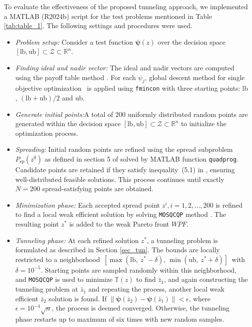 \documentclass[amsa]{ipart}
\theoremstyle{plain}
\numberwithin{equation}{section}
\newcommand{\xlm}{z^*}                    %
\newcommand{\obj}[1]{\psi_{#1}}               %
\newcommand{\fvec}{\boldsymbol{\psi}}         %
\newcommand{\Feas}{\mathcal{Z}}               %
\newcommand{\tun}{\boldsymbol{\mathbb{T}}}                 %
\begin{document}
To evaluate the effectiveness of the proposed tunneling approach, we implemented a MATLAB (R2024b) script for the test problems mentioned in \linebreak
Table \ref{tab:table_1}. The following settings and procedures were used.
\begin{itemize}
\item \textit{Problem setup:} Consider a test function $\fvec(z)$ over the decision space \linebreak $[\text{lb}, \text{ub}]  \subset \Feas \subset \mathbb{R}^n$.    \item \textit{Finding ideal and nadir vector:} The ideal and nadir vectors are computed using the payoff table method \cite{Miettinen1998-to}. For each $\obj{j}$, global descent method for single objective optimization~\cite{duanli2010global} is applied using \texttt{fmincon} with three starting points: $\text{lb}$, $(\text{lb}+\text{ub})/2$ and $\text{ub}$.
    
    \item \textit{Generate initial points:}A total of 200 uniformly distributed random points are generated within the decision space \( [\text{lb}, \text{ub}] \subset \Feas \subset \mathbb{R}^n \) to initialize the optimization process.
    
    \item \textit{Spreading:} 
    Initial random points are refined using the spread subproblem $P_{\text{sp}}(z^0)$ as defined in section 5 of \cite{ansary2021sqcqp} solved by MATLAB function \texttt{quadprog}. Candidate points are retained if they satisfy inequality~(5.1) in \cite{ansary2021sqcqp}, ensuring well-distributed feasible solutions. This process continues until exactly $N=200$ spread-satisfying points are obtained.
        \item \textit{Minimization phase:} Each accepted spread point $z^i,i=1,2,\hdots,200$ is refined to find a local weak efficient solution by solving \texttt{MOSQCQP} method \cite{ansary2021sqcqp}. The resulting point $\xlm$ is added to the weak Pareto front $WPF$.

    \item \textit{Tunneling phase:}  
    At each refined solution $\xlm$, a tunneling problem is formulated as described in Section \ref{sec_tun}. The bounds are locally restricted to a neighborhood 
    \(\,[\max(\text{lb},~\xlm-\delta), \, \min(\text{ub},~\xlm+\delta)]\,\) with $\delta=10^{-5}$. Starting points are sampled randomly within this neighborhood, and \texttt{MOSQCQP} is used to minimize $\tun(z)$ to find $\bar{z}_1$, and again constructing the tunneling problem at $\bar{z}_1$ and repeating the process, another local weak efficient $\bar{z}_2$ solution is found.
    If $\|\fvec(\bar{z}_2)-\fvec(\bar{z}_1)\| < \epsilon$, where \linebreak
    $\epsilon=10^{-4}\sqrt{n}$, the process is deemed converged. Otherwise, the tunneling phase restarts up to maximum of six times with new random samples.


\end{itemize}
\end{document}
